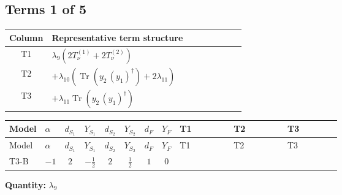 \documentclass[8pt]{article}
\begin{document}
\begin{landscape}
\subsection*{Terms 1 of 5}
\begin{center}
\begin{tabular}{@{}c >{\raggedright\arraybackslash}p{0.82\linewidth}@{}}
\toprule
Column & Representative term structure \\
\midrule
T1 & \(\displaystyle {\lambda_{9}} (2 T_{\nu}^{(1)}+2 T_{\nu}^{(2)})\) \\
\midrule
T2 & \(\displaystyle +{\lambda_{10}} (\operatorname{Tr}\!\left({y_2}\,\left({y_1}\right)^{\dagger}\right)+2 {\lambda_{11}})\) \\
\midrule
T3 & \(\displaystyle +{\lambda_{11}} \operatorname{Tr}\!\left({y_2}\,\left({y_1}\right)^{\dagger}\right)\) \\
\midrule
\bottomrule
\end{tabular}
\end{center}
\smallskip
\tiny
\begin{longtable}{@{}llcccccc >{\raggedright\arraybackslash}p{0.21\linewidth} >{\raggedright\arraybackslash}p{0.21\linewidth} >{\raggedright\arraybackslash}p{0.21\linewidth}@{}}
\toprule
Model & $\alpha$ & $d_{S_1}$ & $Y_{S_1}$ & $d_{S_2}$ & $Y_{S_2}$ & $d_F$ & $Y_F$ & T1 & T2 & T3 \\
\midrule
\endfirsthead
\toprule
Model & $\alpha$ & $d_{S_1}$ & $Y_{S_1}$ & $d_{S_2}$ & $Y_{S_2}$ & $d_F$ & $Y_F$ & T1 & T2 & T3 \\
\midrule
\endhead
T3-B & $-1$ & $2$ & $-\frac{1}{2}$ & $2$ & $\frac{1}{2}$ & $1$ & $0$ & \scriptsize\adjustbox{max width=\linewidth}{$\begin{gathered} {\lambda_{9}} (2 T_{\nu}^{(1)}+2 T_{\nu}^{(2)})\end{gathered}$} & \scriptsize\adjustbox{max width=\linewidth}{$\begin{gathered} +{\lambda_{10}} (\operatorname{Tr}\!\left({y_2}\,\left({y_1}\right)^{\dagger}\right)+2 {\lambda_{11}})\end{gathered}$} & \scriptsize\adjustbox{max width=\linewidth}{$\begin{gathered} +{\lambda_{11}} \operatorname{Tr}\!\left({y_2}\,\left({y_1}\right)^{\dagger}\right)\end{gathered}$} \\
\midrule
\bottomrule
\end{longtable}
\clearpage
\noindent\textbf{Quantity: }$\lambda_{9}$\par\smallskip

\end{landscape}
\end{document}
